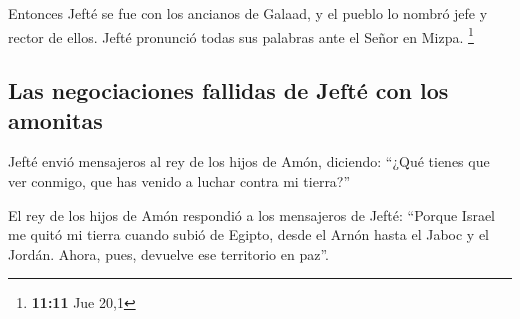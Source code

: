 \begin{paracol}{2}
 Entonces Jefté se fue con los ancianos de Galaad, y el
pueblo lo nombró jefe y rector de ellos. Jefté pronunció todas sus
palabras ante el Señor en Mizpa. \footnote{\textbf{11:11} Jue 20,1}

\hypertarget{las-negociaciones-fallidas-de-jeftuxe9-con-los-amonitas}{%
\subsection{Las negociaciones fallidas de Jefté con los
amonitas}\label{las-negociaciones-fallidas-de-jeftuxe9-con-los-amonitas}}

 Jefté envió mensajeros al rey de los hijos de Amón,
diciendo: ``¿Qué tienes que ver conmigo, que has venido a luchar contra
mi tierra?''

 El rey de los hijos de Amón respondió a los mensajeros
de Jefté: ``Porque Israel me quitó mi tierra cuando subió de Egipto,
desde el Arnón hasta el Jaboc y el Jordán. Ahora, pues, devuelve ese
territorio en paz''.


\end{paracol}
